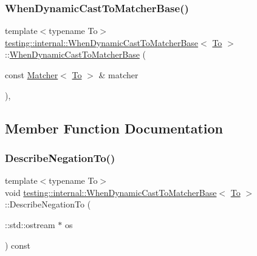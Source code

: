 \subsubsection{\texorpdfstring{When\+Dynamic\+Cast\+To\+Matcher\+Base()}{WhenDynamicCastToMatcherBase()}}
{\footnotesize\ttfamily template$<$typename To$>$ \\
\hyperlink{classtesting_1_1internal_1_1_when_dynamic_cast_to_matcher_base}{testing\+::internal\+::\+When\+Dynamic\+Cast\+To\+Matcher\+Base}$<$ \hyperlink{classtesting_1_1internal_1_1_to}{To} $>$\+::\hyperlink{classtesting_1_1internal_1_1_when_dynamic_cast_to_matcher_base}{When\+Dynamic\+Cast\+To\+Matcher\+Base} (\begin{DoxyParamCaption}\item[{const \hyperlink{classtesting_1_1_matcher}{Matcher}$<$ \hyperlink{classtesting_1_1internal_1_1_to}{To} $>$ \&}]{matcher }\end{DoxyParamCaption})\hspace{0.3cm}{\ttfamily [inline]}, {\ttfamily [explicit]}}



\subsection{Member Function Documentation}
\mbox{\label{classtesting_1_1internal_1_1_when_dynamic_cast_to_matcher_base_a0221de18d3b1945f8bc27fb349116564}} 
\subsubsection{\texorpdfstring{Describe\+Negation\+To()}{DescribeNegationTo()}}
{\footnotesize\ttfamily template$<$typename To$>$ \\
void \hyperlink{classtesting_1_1internal_1_1_when_dynamic_cast_to_matcher_base}{testing\+::internal\+::\+When\+Dynamic\+Cast\+To\+Matcher\+Base}$<$ \hyperlink{classtesting_1_1internal_1_1_to}{To} $>$\+::Describe\+Negation\+To (\begin{DoxyParamCaption}\item[{\+::std\+::ostream $\ast$}]{os }\end{DoxyParamCaption}) const\hspace{0.3cm}{\ttfamily [inline]}}

